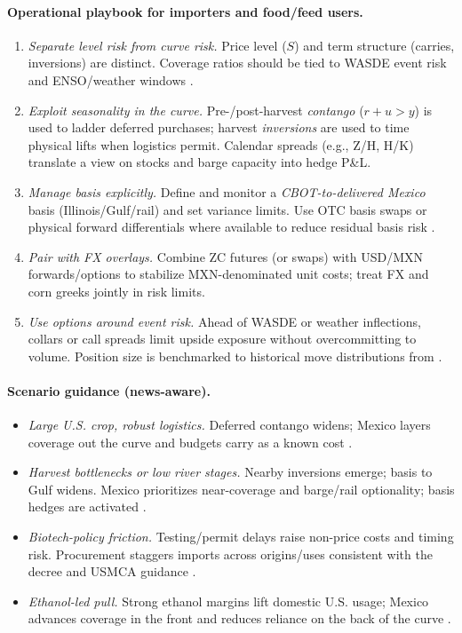 \documentclass[11pt,a4paper]{article} %
\begin{document}
\paragraph{Operational playbook for importers and food/feed users.}
\begin{enumerate}
  \item \textit{Separate level risk from curve risk.} Price level (\(S\)) and term structure (carries, inversions) are distinct. Coverage ratios should be tied to WASDE event risk and ENSO/weather windows \citep{noaa_enso_discussion,usda_wasde}.
  \item \textit{Exploit seasonality in the curve.} Pre-/post-harvest \emph{contango} (\(r+u>y\)) is used to ladder deferred purchases; harvest \emph{inversions} are used to time physical lifts when logistics permit. Calendar spreads (e.g., Z/H, H/K) translate a view on stocks and barge capacity into hedge P\&L.
  \item \textit{Manage basis explicitly.} Define and monitor a \emph{CBOT-to-delivered Mexico} basis (Illinois/Gulf/rail) and set variance limits. Use OTC basis swaps or physical forward differentials where available to reduce residual basis risk \citep{ams_gtr_2023}.
  \item \textit{Pair with FX overlays.} Combine ZC futures (or swaps) with USD/MXN forwards/options to stabilize MXN-denominated unit costs; treat FX and corn greeks jointly in risk limits.
  \item \textit{Use options around event risk.} Ahead of WASDE or weather inflections, collars or call spreads limit upside exposure without overcommitting to volume. Position size is benchmarked to historical move distributions from \citep{usda_wasde}.
\end{enumerate}

\paragraph{Scenario guidance (news-aware).}
\begin{itemize}
  \item \textit{Large U.S. crop, robust logistics.} Deferred contango widens; Mexico layers coverage out the curve and budgets carry as a known cost \citep{ers_feedgrains_outlook,reuters_record_crop_2025}.
  \item \textit{Harvest bottlenecks or low river stages.} Nearby inversions emerge; basis to Gulf widens. Mexico prioritizes near-coverage and barge/rail optionality; basis hedges are activated \citep{ams_gtr_2023}.
  \item \textit{Biotech-policy friction.} Testing/permit delays raise non-price costs and timing risk. Procurement staggers imports across origins/uses consistent with the decree and USMCA guidance \citep{fas_mexico_decree_2023,ustr_usmca_biotech_win_2024,fas_mexico_grain_annual_2025}.
  \item \textit{Ethanol-led pull.} Strong ethanol margins lift domestic U.S. usage; Mexico advances coverage in the front and reduces reliance on the back of the curve \citep{ers_ethanol_40}.
\end{itemize}
\end{document}

